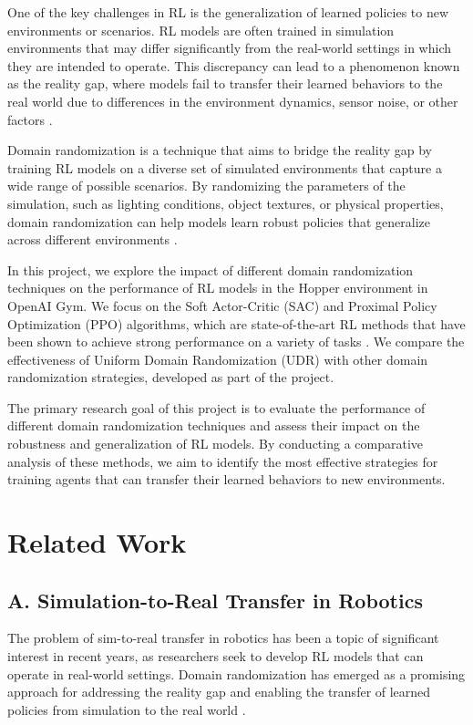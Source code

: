 \documentclass[12pt]{article}
\begin{document}
One of the key challenges in RL is the generalization of learned policies to new environments or scenarios. RL models are often trained in simulation environments that may differ significantly from the real-world settings in which they are intended to operate. This discrepancy can lead to a phenomenon known as the reality gap, where models fail to transfer their learned behaviors to the real world due to differences in the environment dynamics, sensor noise, or other factors \cite{Kormushev2013, Hofer2020}.

Domain randomization is a technique that aims to bridge the reality gap by training RL models on a diverse set of simulated environments that capture a wide range of possible scenarios. By randomizing the parameters of the simulation, such as lighting conditions, object textures, or physical properties, domain randomization can help models learn robust policies that generalize across different environments \cite{Tobin2017, Peng2018}.

In this project, we explore the impact of different domain randomization techniques on the performance of RL models in the Hopper environment in OpenAI Gym. We focus on the Soft Actor-Critic (SAC) and Proximal Policy Optimization (PPO) algorithms, which are state-of-the-art RL methods that have been shown to achieve strong performance on a variety of tasks \cite{Haarnoja2018, Schulman2017}. We compare the effectiveness of Uniform Domain Randomization (UDR) with other domain randomization strategies, developed as part of the project. 

The primary research goal of this project is to evaluate the performance of different domain randomization techniques and assess their impact on the robustness and generalization of RL models. By conducting a comparative analysis of these methods, we aim to identify the most effective strategies for training agents that can transfer their learned behaviors to new environments.

\section{Related Work}

\subsection{A. Simulation-to-Real Transfer in Robotics}

The problem of sim-to-real transfer in robotics has been a topic of significant interest in recent years, as researchers seek to develop RL models that can operate in real-world settings. Domain randomization has emerged as a promising approach for addressing the reality gap and enabling the transfer of learned policies from simulation to the real world \cite{Peng2018}.
\end{document}
